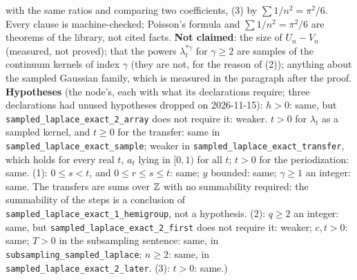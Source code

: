 \begin{proposition}
{with the same ratios and comparing two coefficients, (3) by $\sum 1/n^2 = \pi^2/6$. Every clause is
machine-checked; Poisson's formula and $\sum 1/n^2 = \pi^2/6$ are theorems of the library, not
cited facts. \textbf{Not claimed}: the size
of $U_n - V_n$ (measured, not proved);
that the powers $\lambda^{*\gamma}_t$ for $\gamma \ge 2$ are samples of the continuum \Matern{}
kernels of index $\gamma$ (they are not, for the reason of (2)); anything about the sampled
Gaussian family, which is measured in the paragraph after the proof. \textbf{Hypotheses} (the
node's, each with what its declarations require; three declarations had unused hypotheses dropped on
2026-11-15): $h > 0$: same, but \texttt{sampled\_laplace\_exact\_2\_array} does not require it:
weaker. $t > 0$ for $\lambda_t$ as a sampled kernel, and $t \ge 0$ for the transfer: same in
\texttt{sampled\_laplace\_exact\_sample}; weaker in \texttt{sampled\_laplace\_exact\_transfer},
which holds for every real $t$, $a_t$ lying in $[0,1)$ for all $t$; $t > 0$ for the
periodization: same. (1): $0 \le s < t$, and $0 \le r \le s \le t$: same; $y$ bounded: same;
$\gamma \ge 1$ an integer: same. The transfers are sums over $\mathbb{Z}$ with no summability required: the
summability of the steps is a conclusion of \texttt{sampled\_laplace\_exact\_1\_hemigroup}, not a
hypothesis. (2): $q \ge 2$ an integer: same, but \texttt{sampled\_laplace\_exact\_2\_first} does not
require it: weaker; $c, t > 0$: same; $T > 0$ in the subsampling sentence: same, in
\texttt{subsampling\_sampled\_laplace}; $n \ge 2$: same, in
\texttt{sampled\_laplace\_exact\_2\_later}. (3): $t > 0$: same.)}
\end{proposition}

